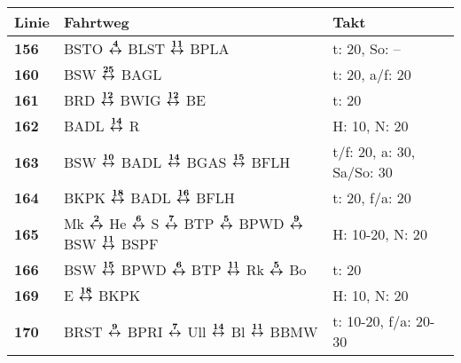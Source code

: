 \begin{minipage}[t]{0.45\textwidth}
\begin{tabular}{>{\bfseries}L{1.2cm}L{9.0cm}L{3.0cm}}
{\bfseries Linie} & {\bfseries Fahrtweg} & {\bfseries Takt} \\
\hline
\bus{} 156    & BSTO $\boldsymbol{\overset{4}{\leftrightarrow}}$ BLST $\boldsymbol{\overset{11}{\leftrightarrow}}$ BPLA                                                                                                                             & t: 20, So: --              \\
\bus{} 160    & BSW $\boldsymbol{\overset{25}{\leftrightarrow}}$ BAGL                                                                                                                                               & t: 20, a/f: 20             \\
\bus{} 161    & BRD $\boldsymbol{\overset{12}{\leftrightarrow}}$ BWIG $\boldsymbol{\overset{12}{\leftrightarrow}}$ BE                                                                                                                               & t: 20                      \\
\bus{} 162    & BADL $\boldsymbol{\overset{14}{\leftrightarrow}}$ R                                                                                                                                                 & H: 10, N: 20               \\
\bus{} 163    & BSW $\boldsymbol{\overset{10}{\leftrightarrow}}$ BADL $\boldsymbol{\overset{14}{\leftrightarrow}}$ BGAS $\boldsymbol{\overset{15}{\leftrightarrow}}$ BFLH                                                                                                           & t/f: 20, a: 30, Sa/So: 30  \\
\bus{} 164    & BKPK $\boldsymbol{\overset{18}{\leftrightarrow}}$ BADL $\boldsymbol{\overset{16}{\leftrightarrow}}$ BFLH                                                                                                            & t: 20, f/a: 20             \\
\bus{} 165    & Mk $\boldsymbol{\overset{2}{\leftrightarrow}}$ He $\boldsymbol{\overset{6}{\leftrightarrow}}$ S $\boldsymbol{\overset{7}{\leftrightarrow}}$ BTP $\boldsymbol{\overset{5}{\leftrightarrow}}$ BPWD $\boldsymbol{\overset{9}{\leftrightarrow}}$ BSW $\boldsymbol{\overset{11}{\leftrightarrow}}$ BSPF                                                                  & H: 10-20, N: 20            \\
\bus{} 166    & BSW $\boldsymbol{\overset{15}{\leftrightarrow}}$ BPWD $\boldsymbol{\overset{6}{\leftrightarrow}}$ BTP $\boldsymbol{\overset{11}{\leftrightarrow}}$ Rk $\boldsymbol{\overset{5}{\leftrightarrow}}$ Bo                                                                                                & t: 20                      \\
\bus{} 169    & E $\boldsymbol{\overset{18}{\leftrightarrow}}$ BKPK                                                                                                                                                 & H: 10, N: 20               \\
\bus{} 170    & BRST $\boldsymbol{\overset{9}{\leftrightarrow}}$ BPRI $\boldsymbol{\overset{7}{\leftrightarrow}}$ Ull $\boldsymbol{\overset{14}{\leftrightarrow}}$ Bl $\boldsymbol{\overset{11}{\leftrightarrow}}$ BBMW                                                                                             & t: 10-20, f/a: 20-30       \\

\end{tabular}
\end{minipage}
